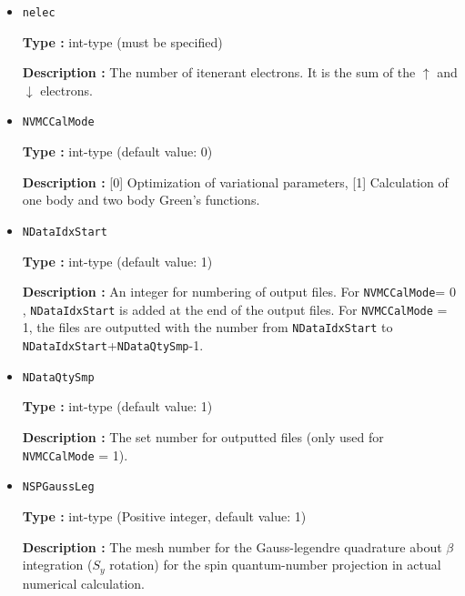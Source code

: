 \begin{itemize}

\item  \verb|nelec|

  {\bf Type :} {int-type (must be specified)}

  {\bf Description :} {The number of itenerant electrons.
    It is the sum of the $\uparrow$ and $\downarrow$ electrons.}

\item  \verb|NVMCCalMode|

 {\bf Type :} int-type (default value: 0)

{\bf Description :} [0] Optimization of variational parameters, [1] Calculation of one body and two body Green's functions.



 
 \item  \verb|NDataIdxStart|

 {\bf Type :} int-type (default value: 1)

{\bf Description :} An integer for numbering of output files. For \verb|NVMCCalMode|= 0 , \verb|NDataIdxStart| is added at the end of the output files. For \verb|NVMCCalMode| = 1,  the files are outputted with the number from \verb|NDataIdxStart| to  \verb|NDataIdxStart|+\verb|NDataQtySmp|-1.
   
 \item  \verb|NDataQtySmp|

 {\bf Type :} int-type (default value: 1)

{\bf Description :} The set number for outputted files (only used for \verb|NVMCCalMode| = 1). 

 \item  \verb|NSPGaussLeg|

{\bf Type :} {int-type (Positive integer, default value: 1)}

{\bf Description :} The mesh number for the Gauss-legendre quadrature about $\beta$ integration ($S_y$ rotation) for the spin quantum-number projection in actual numerical calculation.


\end{itemize}
